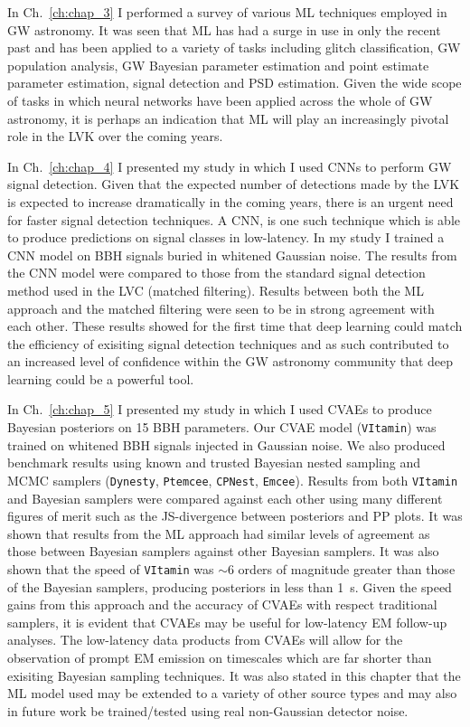 In Ch.~\ref{ch:chap_3} I performed a survey of various \ac{ML} 
techniques employed in \ac{GW} astronomy. It was seen that \ac{ML} has 
had a surge in use in only the recent past and has been applied 
to a variety of tasks including glitch classification, 
\ac{GW} population analysis, \ac{GW} Bayesian parameter 
estimation and point estimate parameter estimation, 
signal detection and \ac{PSD} estimation. Given the wide scope of tasks 
in which neural networks have been applied across the whole of \ac{GW} 
astronomy, it is perhaps an indication that \ac{ML} will play an 
increasingly pivotal role in the \ac{LVK} over the coming years.

In Ch.~\ref{ch:chap_4} I presented my study in which I used \acp{CNN} to 
perform \ac{GW} signal detection. Given that the expected number 
of detections made by the \ac{LVK} is expected to increase dramatically 
in the coming years, there is an urgent need for faster signal detection 
techniques. A \ac{CNN}, is one such technique which is able to 
produce predictions on signal classes in low-latency. In my study I trained
a \ac{CNN} model on 
\ac{BBH} signals buried in whitened Gaussian noise. The 
results from the \ac{CNN} model were compared to those from the standard 
signal detection method used in the \ac{LVC} (matched filtering). 
Results between both the \ac{ML} approach and the matched filtering
were seen to be in strong agreement with each other. These results 
showed for the first time that deep learning could match the efficiency 
of exisiting signal detection 
techniques and as such contributed to an increased level 
of confidence within the \ac{GW} astronomy community 
that deep learning could be a powerful tool. 

In Ch.~\ref{ch:chap_5} I presented my study in which I used \acp{CVAE} to 
produce Bayesian posteriors on 15 \ac{BBH} parameters. Our \ac{CVAE} 
model (\texttt{VItamin}) was trained on whitened \ac{BBH} signals 
injected in Gaussian noise. We also produced benchmark results 
using known and trusted Bayesian nested sampling and \ac{MCMC} 
samplers (\texttt{Dynesty}, \texttt{Ptemcee}, \texttt{CPNest}, 
\texttt{Emcee}). Results from both \texttt{VItamin} and Bayesian samplers 
were compared against each other using many different figures of merit such 
as the \ac{JS}-divergence between posteriors and \ac{PP} plots. It was 
shown that results from the \ac{ML} approach had similar levels 
of agreement as those between Bayesian samplers against other Bayesian 
samplers. It was also shown that the speed of \texttt{VItamin} 
was $\sim 6$ orders of magnitude greater than those of the Bayesian 
samplers, producing posteriors in less than 1~s. Given the speed gains 
from this approach and the accuracy of \acp{CVAE} with respect traditional 
samplers, it is evident that \acp{CVAE} may be useful for low-latency
\ac{EM} follow-up analyses. The low-latency data products from \acp{CVAE} 
will allow for the observation of prompt \ac{EM} emission on timescales 
which are far shorter than exisiting Bayesian sampling techniques. 
It was also stated in this chapter that the \ac{ML} model used may 
be extended to a variety of other source types and may also in future work 
be trained/tested using real non-Gaussian detector noise.

